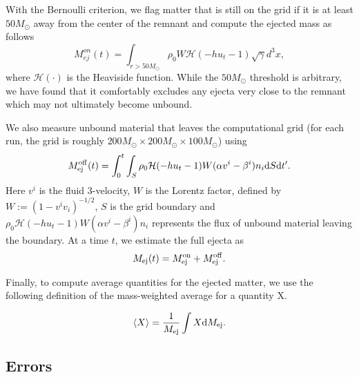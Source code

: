 With the Bernoulli criterion, we flag matter that is still on the grid if it is at least $50M_\odot$ away from the center of the remnant and compute the ejected mass as follows
%
\begin{equation}
M^{on}_{ej}(t) = \int_{r>50M_\odot}\rho_0 W\mathcal{H}(-hu_t - 1)\sqrt{\gamma}{d}^3x,
\end{equation}
%
%
where $\mathcal{H}(\cdot)$ is the Heaviside function. While the $50M_\odot$ threshold is arbitrary, we have found that it comfortably excludes any ejecta very close to the remnant which may not ultimately become unbound.

We also measure unbound material that leaves the computational grid (for each run, the grid is roughly $200M_\odot \times 200M_\odot \times 100M_\odot$) using
%
\begin{equation}
M^{\rm off}_{\rm ej}(t) = \int^t_0\int_S\rho_0\mathcal{H}(-hu_t - 1) W(\alpha v^i - \beta^i)n_i\mathrm{d}S\mathrm{d}t'.
\end{equation}
%
Here $v^i$ is the fluid 3-velocity, $W$ is the Lorentz factor, defined by $W := (1-v^iv_i)^{-1/2}$, $S$ is the grid boundary and $\rho_0 \mathcal{H}(-hu_t - 1)W(\alpha v^i - \beta^i)n_i$ represents the flux of unbound material leaving the boundary. At a time $t$, we estimate the full ejecta as
%
\begin{equation}
M_{\rm ej}(t) = M^{\rm on}_{\rm ej} + M^{\rm off}_{\rm ej}.
\end{equation}

Finally, to compute average quantities for the ejected matter, we use the following definition of the mass-weighted average for a quantity X.

\begin{equation}
  \left< X \right> = \frac{1}{M_{\rm ej}}\int X \mathrm{d}M_{\rm ej}.
\end{equation}


\subsection{Errors}

